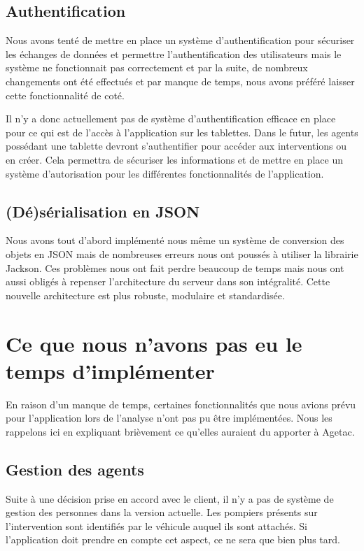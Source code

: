 \documentclass{article}
\begin{document}
\subsection{Authentification}
Nous avons tenté de mettre en place un système d’authentification pour sécuriser les échanges de données et permettre l’authentification des utilisateurs mais le système ne fonctionnait pas correctement et par la suite, de nombreux changements ont été effectués et par manque de temps, nous avons préféré laisser cette fonctionnalité de coté.

Il n’y a donc actuellement pas de système d’authentification efficace en place pour ce qui est de l’accès à l’application sur les tablettes. Dans le futur, les agents possédant une tablette devront s'authentifier pour accéder aux interventions ou en créer. Cela permettra de sécuriser les informations et de mettre en place un système d’autorisation pour les différentes fonctionnalités de l’application.

\subsection{(Dé)sérialisation en JSON}

Nous avons tout d’abord implémenté nous même un système de conversion des objets en JSON mais de nombreuses erreurs nous ont poussés à utiliser la librairie Jackson. Ces problèmes nous ont fait perdre beaucoup de temps mais nous ont aussi obligés à repenser l’architecture du serveur dans son intégralité. Cette nouvelle architecture est plus robuste, modulaire et standardisée.


\section{Ce que nous n'avons pas eu le temps d'implémenter}

En raison d’un manque de temps, certaines fonctionnalités que nous avions prévu pour l’application lors de l’analyse n’ont pas pu être implémentées. Nous les rappelons ici en expliquant brièvement ce qu’elles auraient du apporter à Agetac.

\subsection{Gestion des agents}

Suite à une décision prise en accord avec le client, il n’y a pas de système de gestion des personnes dans la version actuelle. Les pompiers présents sur l’intervention sont identifiés par le véhicule auquel ils sont attachés. Si l’application doit prendre en compte cet aspect, ce ne sera que bien plus tard.
\end{document}

